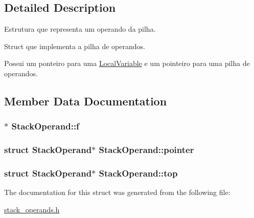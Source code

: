 \subsection{Detailed Description}
Estrutura que representa um operando da pilha. 

Struct que implementa a pilha de operandos.

Possui um ponteiro para uma \hyperlink{structLocalVariable}{Local\+Variable} e um pointeiro para uma pilha de operandos. 

\subsection{Member Data Documentation}
\subsubsection[{\texorpdfstring{f}{f}}]{$\ast$ Stack\+Operand\+::f}\hypertarget{structStackOperand_ac2430d118d01240603507706e8a8adff}{}\label{structStackOperand_ac2430d118d01240603507706e8a8adff}
\subsubsection[{\texorpdfstring{pointer}{pointer}}]{\setlength{\rightskip}{0pt plus 5cm}struct {\bf Stack\+Operand}$\ast$ Stack\+Operand\+::pointer}\hypertarget{structStackOperand_af4ad4c3c4e49be261c61b3856bc02b9f}{}\label{structStackOperand_af4ad4c3c4e49be261c61b3856bc02b9f}
\subsubsection[{\texorpdfstring{top}{top}}]{\setlength{\rightskip}{0pt plus 5cm}struct {\bf Stack\+Operand}$\ast$ Stack\+Operand\+::top}\hypertarget{structStackOperand_a11a33c73ab08f65a14fb53af2308d052}{}\label{structStackOperand_a11a33c73ab08f65a14fb53af2308d052}


The documentation for this struct was generated from the following file\+:\begin{DoxyCompactItemize}
\item 
\hyperlink{stack__operands_8h}{stack\+\_\+operands.\+h}\end{DoxyCompactItemize}
